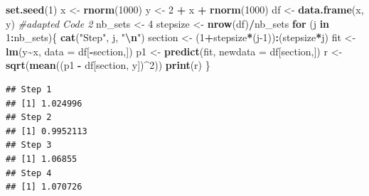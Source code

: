 \documentclass[
]{article}
\newenvironment{Shaded}{\begin{snugshade}}{\end{snugshade}}
\newcommand{\AttributeTok}[1]{\textcolor[rgb]{0.13,0.29,0.53}{#1}}
\newcommand{\CommentTok}[1]{\textcolor[rgb]{0.56,0.35,0.01}{\textit{#1}}}
\newcommand{\ControlFlowTok}[1]{\textcolor[rgb]{0.13,0.29,0.53}{\textbf{#1}}}
\newcommand{\DecValTok}[1]{\textcolor[rgb]{0.00,0.00,0.81}{#1}}
\newcommand{\FunctionTok}[1]{\textcolor[rgb]{0.13,0.29,0.53}{\textbf{#1}}}
\newcommand{\NormalTok}[1]{#1}
\newcommand{\OtherTok}[1]{\textcolor[rgb]{0.56,0.35,0.01}{#1}}
\newcommand{\SpecialCharTok}[1]{\textcolor[rgb]{0.81,0.36,0.00}{\textbf{#1}}}
\newcommand{\StringTok}[1]{\textcolor[rgb]{0.31,0.60,0.02}{#1}}
\begin{document}
\begin{Shaded}
\begin{Highlighting}[]
\FunctionTok{set.seed}\NormalTok{(}\DecValTok{1}\NormalTok{) }
\NormalTok{x }\OtherTok{\textless{}{-}} \FunctionTok{rnorm}\NormalTok{(}\DecValTok{1000}\NormalTok{)}
\NormalTok{y }\OtherTok{\textless{}{-}} \DecValTok{2} \SpecialCharTok{+}\NormalTok{ x }\SpecialCharTok{+} \FunctionTok{rnorm}\NormalTok{(}\DecValTok{1000}\NormalTok{)}
\NormalTok{df }\OtherTok{\textless{}{-}} \FunctionTok{data.frame}\NormalTok{(x, y)}
\CommentTok{\#adapted Code 2}
\NormalTok{nb\_sets }\OtherTok{\textless{}{-}} \DecValTok{4}
\NormalTok{stepsize }\OtherTok{\textless{}{-}} \FunctionTok{nrow}\NormalTok{(df)}\SpecialCharTok{/}\NormalTok{nb\_sets}
\ControlFlowTok{for}\NormalTok{ (j }\ControlFlowTok{in} \DecValTok{1}\SpecialCharTok{:}\NormalTok{nb\_sets)\{}
  \FunctionTok{cat}\NormalTok{(}\StringTok{"Step"}\NormalTok{, j, }\StringTok{"}\SpecialCharTok{\textbackslash{}n}\StringTok{"}\NormalTok{)}
\NormalTok{  section }\OtherTok{\textless{}{-}}\NormalTok{ (}\DecValTok{1}\SpecialCharTok{+}\NormalTok{stepsize}\SpecialCharTok{*}\NormalTok{(j}\DecValTok{{-}1}\NormalTok{))}\SpecialCharTok{:}\NormalTok{(stepsize}\SpecialCharTok{*}\NormalTok{j)}
\NormalTok{  fit }\OtherTok{\textless{}{-}} \FunctionTok{lm}\NormalTok{(y}\SpecialCharTok{\textasciitilde{}}\NormalTok{x, }\AttributeTok{data =}\NormalTok{ df[}\SpecialCharTok{{-}}\NormalTok{section,])}
\NormalTok{  p1 }\OtherTok{\textless{}{-}} \FunctionTok{predict}\NormalTok{(fit, }\AttributeTok{newdata =}\NormalTok{ df[section,])}
\NormalTok{  r }\OtherTok{\textless{}{-}} \FunctionTok{sqrt}\NormalTok{(}\FunctionTok{mean}\NormalTok{((p1 }\SpecialCharTok{{-}}\NormalTok{ df[section, }\StringTok{\textquotesingle{}y\textquotesingle{}}\NormalTok{])}\SpecialCharTok{\^{}}\DecValTok{2}\NormalTok{))}
  \FunctionTok{print}\NormalTok{(r)}
\NormalTok{\}}
\end{Highlighting}
\end{Shaded}

\begin{verbatim}
## Step 1 
## [1] 1.024996
## Step 2 
## [1] 0.9952113
## Step 3 
## [1] 1.06855
## Step 4 
## [1] 1.070726
\end{verbatim}
\end{document}
